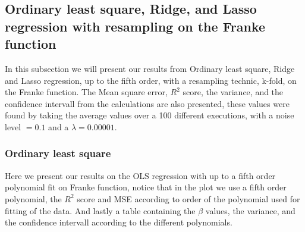 
\subsection{Ordinary least square, Ridge, and Lasso regression with resampling on the Franke function}

In this subsection we will present our results from Ordinary least square, Ridge and Lasso regression, up to the fifth order, with a resampling technic, k-fold, on the Franke function. The Mean square error, $R^2$ score, the variance, and the confidence intervall from the calculations are also presented, these values were found by taking the average values over a 100 different executions, with a noise level $= 0.1$ and a $\lambda = 0.00001$.


\subsubsection{Ordinary least square}
Here we present our results on the OLS regression with up to a fifth order polynomial fit on Franke function, notice that in the plot we use a fifth order polynomial, the $R^2$ score and MSE according to order of the polynomial used for fitting of the data. And lastly a table containing the $\beta$ values, the variance, and the confidence intervall according to the different polynomials.



